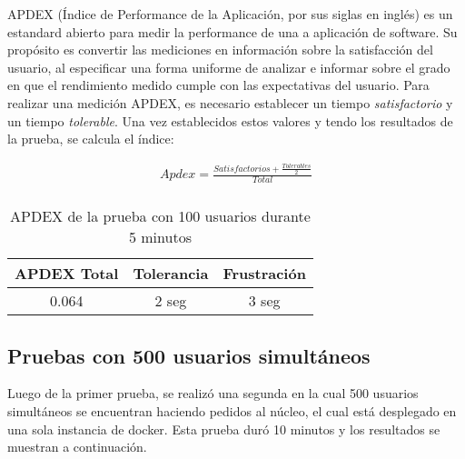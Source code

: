 APDEX (Índice de Performance de la Aplicación, por sus siglas en inglés) es un estandard abierto para medir la performance de una a aplicación de software. Su propósito es convertir las mediciones en información sobre la satisfacción del usuario, al especificar una forma uniforme de analizar e informar sobre el grado en que el rendimiento medido cumple con las expectativas del usuario.
Para realizar una medición APDEX, es necesario establecer un tiempo \emph{satisfactorio} y un tiempo \emph{tolerable}.
Una vez establecidos estos valores y tendo los resultados de la prueba, se calcula el índice:

\begin{align*}
  Apdex = \frac{Satisfactorios + \frac{Tolerables}{2}}{Total}\\
\end{align*}
\break
\begin{table}[]
    \centering
    \makegapedcells
    \begin{tabular}{|c|c|c}
    \hline
    APDEX Total & Tolerancia & Frustración\\ \hline
    0.064 & 2 seg & 3 seg \\ \hline
    \end{tabular}
    \caption{APDEX de la prueba con 100 usuarios durante 5 minutos}
    \label{tab:tabla_planes}
\end{table}


\break

\subsection{Pruebas con 500 usuarios simultáneos}
Luego de la primer prueba, se realizó una segunda en la cual 500 usuarios simultáneos se encuentran haciendo pedidos al núcleo, el cual está desplegado en una sola instancia de docker.
Esta prueba duró 10 minutos y los resultados se muestran a continuación.

